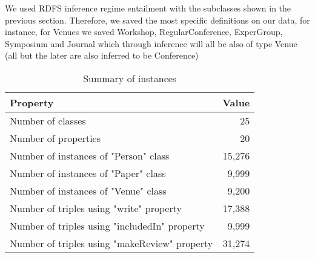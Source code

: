 We used RDFS inference regime entailment with the subclasses shown in the previous section. Therefore,
we saved the most specific definitions on our
data, for instance, for Venues we saved Workshop, RegularConference, ExperGroup, Symposium and Journal
which through inference will all be also of type Venue (all but the later are also inferred to be Conference)


\begin{table}[H]
\centering
\caption{Summary of instances}
\label{tab:summary_instances}
\begin{tabular}{lr}
  \toprule
  Property & Value \\
  \midrule
  Number of classes & 25\\
  Number of properties & 20\\
  Number of instances of "Person" class & 15,276\\
  Number of instances of "Paper" class & 9,999\\
  Number of instances of "Venue" class & 9,200\\
  Number of triples using "write" property & 17,388\\
  Number of triples using "includedIn" property & 9,999\\
    Number of triples using "makeReview" property & 31,274\\
  \bottomrule
\end{tabular}
\end{table}

